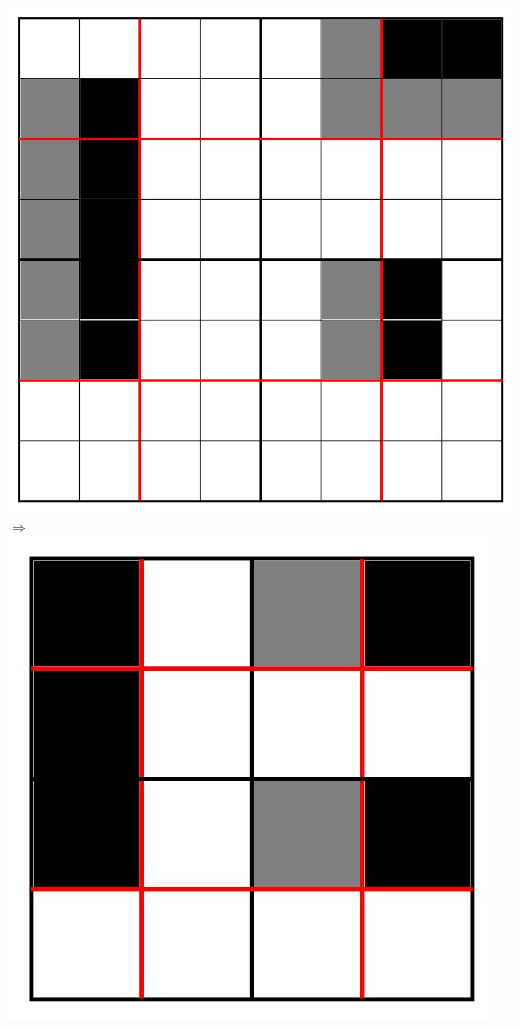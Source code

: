 \documentclass[12pt,aspectratio=169]{beamer}
\begin{document}
\begin{frame}

\begin{center}
\includegraphics[scale=0.2]{pooling1}\pause \hspace{20pt} $\Longrightarrow$
\hspace{20pt} 
\includegraphics[scale=0.2]{pooling2}
\end{center}

\end{frame}
\end{document}
